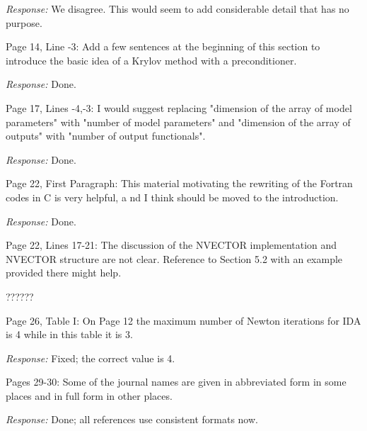 \documentclass[12pt]{letter}
\begin{document}
{\em Response:} We disagree.  This would seem to add considerable
detail that has no purpose.

Page 14, Line -3: Add a few sentences at the beginning of this section
to introduce the basic idea of a Krylov method with a preconditioner.

{\em Response:} Done.

Page 17, Lines -4,-3: I would suggest replacing "dimension of the array
of model parameters" with "number of model parameters" and "dimension of
the array of outputs" with "number of output functionals".

{\em Response:} Done.

Page 22, First Paragraph: This material motivating the rewriting of
the Fortran codes in C is very helpful, a nd I think should be moved
to the introduction.

{\em Response: } Done.

Page 22, Lines 17-21: The discussion of the NVECTOR implementation and
NVECTOR structure are not clear.  Reference to Section 5.2 with an
example provided there might help.

??????

Page 26, Table I: On Page 12 the maximum number of Newton iterations
for IDA is 4 while in this table it is 3.

{\em Response:} Fixed; the correct value is 4.

Pages 29-30: Some of the journal names are given in abbreviated form
in some places and in full form in other places.

{\em Response:} Done; all references use consistent formats now.
\end{document}
